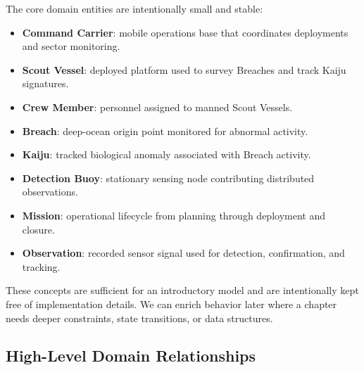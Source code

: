 The core domain entities are intentionally small and stable:
\begin{itemize}
    \item \textbf{Command Carrier}: mobile operations base that coordinates deployments and sector monitoring.
    \item \textbf{Scout Vessel}: deployed platform used to survey Breaches and track Kaiju signatures.
    \item \textbf{Crew Member}: personnel assigned to manned Scout Vessels.
    \item \textbf{Breach}: deep-ocean origin point monitored for abnormal activity.
    \item \textbf{Kaiju}: tracked biological anomaly associated with Breach activity.
    \item \textbf{Detection Buoy}: stationary sensing node contributing distributed observations.
    \item \textbf{Mission}: operational lifecycle from planning through deployment and closure.
    \item \textbf{Observation}: recorded sensor signal used for detection, confirmation, and tracking.
\end{itemize}

These concepts are sufficient for an introductory model and are intentionally kept free of implementation details. We can enrich behavior later where a chapter needs deeper constraints, state transitions, or data structures.

\subsection{High-Level Domain Relationships}
\label{sec:case_study_high_level_domain_relationships}

